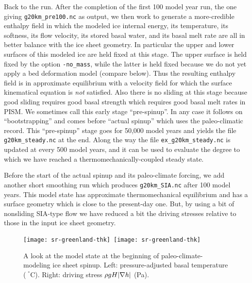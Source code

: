 Back to the run.  After the completion of the first 100 model year run, the one giving \texttt{g20km_pre100.nc} as output, we then work to generate a more-credible enthalpy field in which the modeled ice internal energy, its temperature, its softness, its flow velocity, its stored basal water, and its basal melt rate are all in better balance with the ice sheet geometry.  In particular the upper and lower surfaces of this modeled ice are held fixed at this stage.  The upper surface is held fixed by the option \texttt{-no_mass}, while the latter is held fixed because we do not yet apply a bed deformation model (compare below).  Thus the resulting enthalpy field is in approximate equilibrium with a velocity field for which the surface kinematical equation \cite{Fowler} is \emph{not} satisfied.  Also there is no sliding at this stage because good sliding requires good basal strength which requires good basal melt rates in PISM.  We sometimes call this early stage ``pre-spinup''.  In any case it follows on ``bootstrapping'' and comes before ``actual spinup'' which uses the paleo-climatic record.  This ``pre-spinup'' stage goes for 50,000 model years and yields the file \texttt{g20km_steady.nc} at the end.  Along the way the file \texttt{ex_g20km_steady.nc} is updated at every 500 model years, and it can be used to evaluate the degree to which we have reached a thermomechanically-coupled steady state.

Before the start of the actual spinup and its paleo-climate forcing, we add another short smoothing run which produces \texttt{g20km_SIA.nc} after 100 model years.  This model state has approximate thermomechanical equilibrium and has a surface geometry which is close to the present-day one.  But, by using a bit of nonsliding SIA-type flow we have reduced a bit the driving stresses relative to those in the input ice sheet geometry.

\begin{figure}[ht]
\centering
\mbox{\texttt{[image: sr-greenland-thk]}
  \qquad \texttt{[image: sr-greenland-thk]}}
\caption{A look at the model state at the beginning of paleo-climate-modeling ice sheet spinup.  Left: pressure-adjusted basal temperature ($\phantom{|}^\circ$C).  Right: driving stress $\rho g H |\nabla h|$ (Pa).}
\label{fig:sr-spinstart}
\end{figure}

